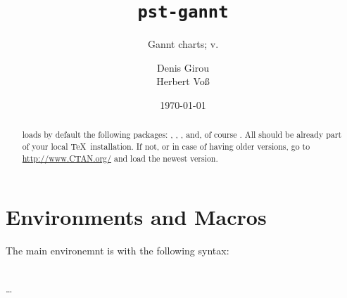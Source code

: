 \documentclass[11pt,english,BCOR10mm,DIV12,bibliography=totoc,parskip=false,smallheadings
    headexclude,footexclude,oneside]{pst-doc}
\let\pstGanntFV\fileversion
\begin{document}
\title{\texttt{pst-gannt}}
\subtitle{Gannt charts; v.\pstGanntFV}
\author{Denis Girou\\Herbert Vo\ss}
\date{\today}
\maketitle

\tableofcontents

\clearpage

\begin{abstract}
\noindent
{} loads by default the following packages: , 
, , and, of course .
All should be already part of your local \TeX\ installation. If not, or in case
of having older versions, go to \url{http://www.CTAN.org/} and load the newest version.

\vfill\noindent

\end{abstract}

\section{Environments and Macros}

The main environemnt is  with the following syntax:

\begin{BDef}
\OptArgs{}\\
\ldots
{}\\[5pt]
\OptArgs{}
\end{BDef}




\begingroup
\begin{LTXexample}
\begin{PstGanttChart}{5}{7}
\end{PstGanttChart}
\end{LTXexample}
\endgroup
{}
%
\end{document}
